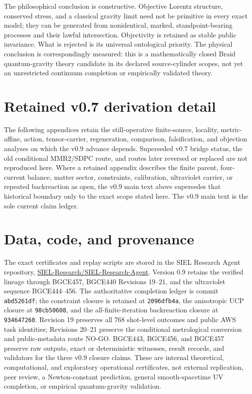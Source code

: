 \documentclass[11pt]{article}
\theoremstyle{definition}
\theoremstyle{remark}
\begin{document}
The philosophical conclusion is constructive. Objective Lorentz structure, conserved stress, and a classical gravity limit need not be primitive in every exact model; they can be generated from nonidentical, marked, standpoint-bearing processes and their lawful intersection. Objectivity is retained as stable public invariance. What is rejected is its universal ontological priority. The physical conclusion is correspondingly measured: this is a mathematically closed Braid quantum-gravity theory candidate in its declared source-cylinder scopes, not yet an unrestricted continuum completion or empirically validated theory.

\appendix
\section*{Retained v0.7 derivation detail}

The following appendices retain the still-operative finite-source, locality, metric-affine, action, tensor-carrier, regeneration, comparison, falsification, and objection analyses on which the v0.9 advance depends. Superseded v0.7 bridge status, the old conditional MMR2/SDPC route, and routes later reversed or replaced are not reproduced here. Where a retained appendix describes the finite parent, four-current balance, matter sector, constraints, calibration, ultraviolet carrier, or repeated backreaction as open, the v0.9 main text above supersedes that historical boundary only to the exact scope stated here. The v0.9 main text is the sole current claim ledger.



\section*{Data, code, and provenance}

The exact certificates and replay scripts are stored in the SIEL Research Agent repository,
\href{https://github.com/SIEL-Research/SIEL-Research-Agent}{SIEL-Research/SIEL-Research-Agent}. Version 0.9 retains the verified lineage through BGCE457, BGCE440 Revisions 19--21, and the ultraviolet sequence BGCE444--456. The authoritative completion ledger is commit \texttt{abd5261df}; the constraint closure is retained at \texttt{2096dfb4a}, the anisotropic UCP closure at \texttt{98cb50608}, and the all-finite-iteration backreaction closure at \texttt{934647260}. Revision 19 preserves all 768 shot-level outcomes and public AWS task identities; Revisions 20--21 preserve the conditional metrological conversion and public-metadata route NO-GO. BGCE443, BGCE456, and BGCE457 preserve raw outputs, exact or deterministic witnesses, result records, and validators for the three v0.9 closure claims. These are internal theoretical, computational, and exploratory operational certificates, not external replication, peer review, a Newton-constant prediction, general smooth-spacetime UV completion, or empirical quantum-gravity validation.
\end{document}
